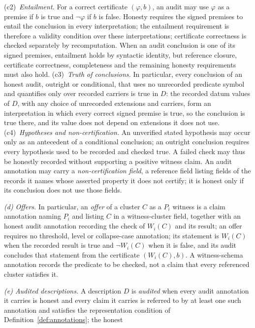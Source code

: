 \begin{definition}
(c2)~\emph{Entailment.} For a correct certificate
\((\varphi,b)\), an audit may use \(\varphi\) as a premise if \(b\) is true
and \(\neg\varphi\) if \(b\) is false. Honesty requires the signed premises to entail the conclusion in every
interpretation; the entailment requirement is therefore a validity condition over these interpretations; certificate correctness is checked separately by recomputation. When an audit conclusion is one of its signed premises, entailment holds by syntactic identity, but reference closure, certificate correctness, completeness and the remaining honesty requirements must also hold. (c3)~\emph{Truth of conclusions.} In particular, every conclusion of an honest audit, outright or conditional, that uses no unrecorded predicate
symbol and quantifies only over recorded carriers is true in \(D\): the recorded
datum values of \(D\), with any choice of unrecorded extensions and carriers,
form an interpretation in which every correct signed premise is true, so the
conclusion is true there, and its value does not depend on extensions it does
not use. (c4)~\emph{Hypotheses and non-certification.} An unverified stated hypothesis may occur only as
an antecedent of a conditional conclusion; an outright conclusion requires
every hypothesis used to be recorded and checked true. A failed check may thus
be honestly recorded without supporting a positive witness claim. An audit
annotation may carry a \emph{non-certification field}, a reference field
listing fields of the
records it names whose asserted property it does not certify; it is honest
only if its conclusion does not use those fields.
\par\emph{(d) Offers.} In particular, an \emph{offer} of a cluster \(C\) as a \(P_i\)
witness is a claim annotation naming \(P_i\) and listing \(C\) in a
witness-cluster field, together with an honest
audit annotation recording the check of \(W_i(C)\) and its result; an offer
requires no threshold, level or collapse-case annotation; its statement is
\(W_i(C)\) when the recorded result is true and \(\neg W_i(C)\) when it is false,
and its audit concludes that statement from the certificate \((W_i(C),b)\). A
witness-schema annotation records the predicate to be checked, not a claim
that every referenced cluster satisfies it.
\par\emph{(e) Audited descriptions.} A description \(D\) is
\emph{audited} when every audit annotation it carries is honest and every
claim it carries is referred to by at least one such annotation and
satisfies the representation condition of Definition~\ref{def:annotations}; the honest

\end{definition}
